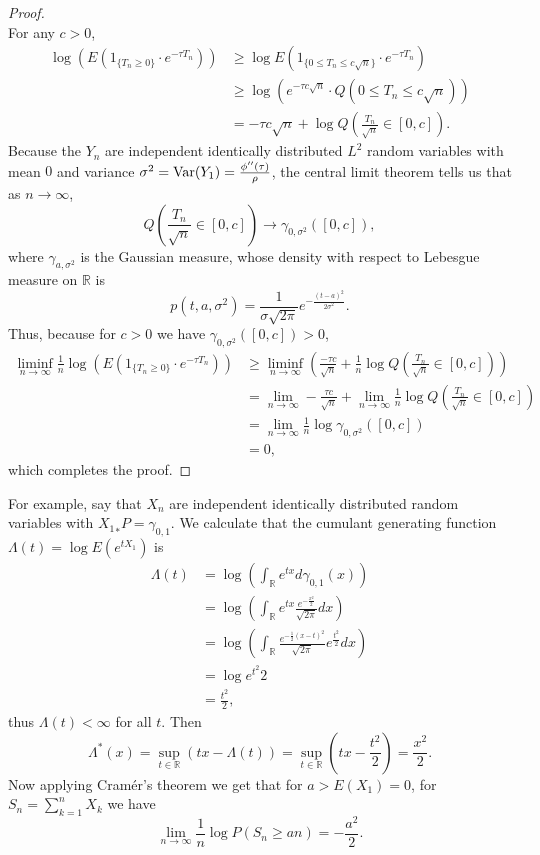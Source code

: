 \documentclass{article}
\newcommand{\Var}{\ensuremath\mathrm{Var}}
\theoremstyle{definition}
\begin{document}
\begin{proof}
\[\]
For any $c>0$, 
\begin{align*}
\log\left( E(1_{\{T_n \geq 0\}} \cdot e^{-\tau T_n})\right) & \geq \log E\left(1_{\{0 \leq T_n \leq c \sqrt{n}\}} \cdot  e^{-\tau T_n} \right)\\
&\geq \log \left( e^{-\tau c\sqrt{n}} \cdot Q\left( 0\leq T_n \leq c\sqrt{n}\right) \right)\\
&=-\tau c \sqrt{n} + \log Q \left( \frac{T_n}{\sqrt{n}} \in [0,c]\right). 
\end{align*}
Because the $Y_n$ are independent  identically distributed $L^2$ random variables
with mean $0$ and variance $\sigma^2=\Var(Y_1)=\frac{\phi''(\tau)}{\rho}$,
the central limit theorem tells
us that  as $n \to \infty$,
\[
Q\left( \frac{T_n}{\sqrt{n}} \in [0,c] \right) \to \gamma_{0,\sigma^2}([0,c]), 
\]
where $\gamma_{a,\sigma^2}$ is the Gaussian measure, whose density with respect to Lebesgue measure on $\mathbb{R}$
is 
\[
p(t,a,\sigma^2)= \frac{1}{\sigma \sqrt{2\pi}} e^{-\frac{(t-a)^2}{2\sigma^2}}.
\]
Thus, because for $c>0$ we have  $\gamma_{0,\sigma^2}([0,c])>0$,
\begin{align*}
\liminf_{n \to \infty} \frac{1}{n} \log\left( E(1_{\{T_n \geq 0\}} \cdot e^{-\tau T_n})\right)
&\geq \liminf_{n \to \infty} \left(\frac{-\tau c}{\sqrt{n}} + \frac{1}{n} \log Q \left( \frac{T_n}{\sqrt{n}} \in [0,c]\right) \right)\\
&=\lim_{n \to \infty} -\frac{\tau c}{\sqrt{n}} + \lim_{n \to \infty} \frac{1}{n} \log Q \left( \frac{T_n}{\sqrt{n}} \in [0,c]\right)\\
&=\lim_{n \to \infty} \frac{1}{n} \log  \gamma_{0,\sigma^2}([0,c])\\
&=0,
\end{align*}
which completes the proof.
\end{proof}


For example, say that $X_n$ are independent identically distributed random variables with
${X_1}_*P=\gamma_{0,1}$. 
We calculate that the cumulant generating function $\Lambda(t)=\log E(e^{tX_1})$ is
\begin{align*}
\Lambda(t)&=\log \left( \int_\mathbb{R} e^{tx} d\gamma_{0,1}(x) \right)\\
&=\log \left(  \int_\mathbb{R} e^{tx} \frac{e^{-\frac{x^2}{2}}}{\sqrt{2\pi}} dx \right)\\
&=\log \left( \int_\mathbb{R} \frac{e^{-\frac{1}{2}(x-t)^2}}{\sqrt{2\pi}} e^{\frac{t^2}{2}}  dx \right)\\
&=\log e^{t^2}{2}\\
&=\frac{t^2}{2},
\end{align*}
thus $\Lambda(t)<\infty$ for all $t$. 
Then
\[
\Lambda^*(x) = \sup_{t \in \mathbb{R}} (tx - \Lambda(t))
=\sup_{t \in \mathbb{R}} \left(tx-\frac{t^2}{2} \right)
=\frac{x^2}{2}.
\]
Now applying Cram\'er's theorem we get that for $a>E(X_1)=0$,
for $S_n=\sum_{k=1}^n X_k$ we have
\[
\lim_{n \to \infty} \frac{1}{n} \log P(S_n \geq an)
=-\frac{a^2}{2}.
\]
\end{document}
